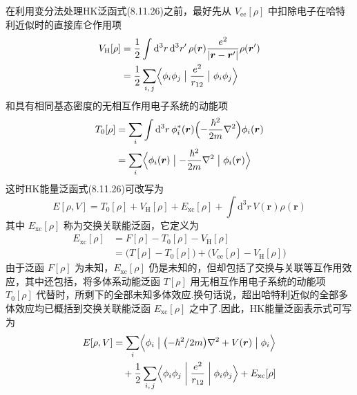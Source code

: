 在利用变分法处理HK泛函式(8.11.26)之前，最好先从 $V_{\mathrm{ee}}[\rho]$ 中扣除电子在哈特利近似时的直接库仑作用项
\begin{equation}
\begin{aligned}
  V_{\mathrm{H}}[\rho]
  &=\frac{1}{2}\int\mathrm{d}^{3}r\,\mathrm{d}^{3}r'\,\rho(\boldsymbol{r})
  \frac{e^{2}}{|\boldsymbol{r}-\boldsymbol{r}'|}\rho(\boldsymbol{r}')\\
  &=\frac{1}{2}\sum_{i,\,j}\Bigl\langle\phi_{i}\phi_{j}\bigm|\frac{e^{2}}{r_{12}}\bigm|\phi_{i}\phi_{j}\Bigr\rangle
\end{aligned}
\end{equation}
和具有相同基态密度的无相互作用电子系统的动能项
\begin{equation}
\begin{aligned}
  T_{0}[\rho]
  &=\sum_{i}\int\mathrm{d}^{3}r\,\phi_{i}^{*}(\boldsymbol{r})
  \Bigl(-\frac{\hbar^{2}}{2m}\nabla^{2}\Bigr)\phi_{i}(\boldsymbol{r})\\
  &=\sum_{i}\Bigl\langle\phi_{i}(\boldsymbol{r})\bigm|-\frac{\hbar^{2}}{2m}\nabla^{2}\bigm|\phi_{i}(\boldsymbol{r})\Bigr\rangle
\end{aligned}
\end{equation}
这时HK能量泛函式(8.11.26)可改写为
\begin{equation}
  E[\rho,V]=T_{0}[\rho]+V_{\mathrm{H}}[\rho]+E_{\mathrm{xc}}[\rho]
  +\int\mathrm{d}^{3}r\,V(\boldsymbol{r})\rho(\boldsymbol{r})
\end{equation}
其中 $E_{\mathrm{xc}}[\rho]$ 称为交换关联能泛函，它定义为
\begin{equation}
\begin{aligned}
  E_{\mathrm{xc}}[\rho]&=F[\rho]-T_{0}[\rho]-V_{\mathrm{H}}[\rho]\\
  &=\bigl(T[\rho]-T_{0}[\rho]\bigr)+\bigl(V_{\mathrm{ee}}[\rho]-V_{\mathrm{H}}[\rho]\bigr)
\end{aligned}
\end{equation}
由于泛函 $F[\rho]$ 为未知，$E_{\mathrm{xc}}[\rho]$ 仍是未知的，但却包括了交换与关联等互作用效应，其中还包括，将多体系动能泛函 $T[\rho]$ 用无相互作用电子系统的动能项 $T_{0}[\rho]$ 代替时，所剩下的全部未知多体效应.换句话说，超出哈特利近似的全部多体效应均已概括到交换关联能泛函 $E_{\mathrm{xc}}[\rho]$ 之中了.因此，HK能量泛函表示式可写为
\begin{equation}
\begin{aligned}
  E[\rho,V]&=\sum_{i}\Bigl\langle\phi_{i}\bigm|\bigl(-\hbar^{2}/2m\bigr)\nabla^{2}+V(\boldsymbol{r})\bigm|\phi_{i}\Bigr\rangle\\
  &\quad+\frac{1}{2}\sum_{i,\,j}\Bigl\langle\phi_{i}\phi_{j}\biggm|\frac{e^{2}}{r_{12}}\biggm|\phi_{i}\phi_{j}\Bigr\rangle+E_{\mathrm{xc}}[\rho]
\end{aligned}
\end{equation}
